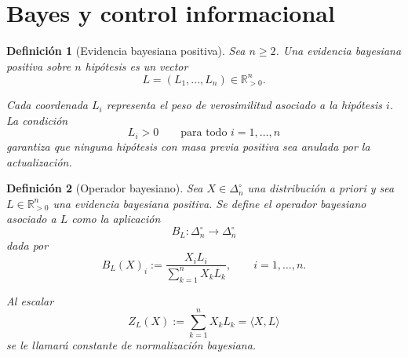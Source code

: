 \documentclass[12pt]{article}
\newtheorem{definicion}{Definición}[section]
\begin{document}
%
%
%
%


\clearpage
\section{Bayes y control informacional}

\begin{definicion}[Evidencia bayesiana positiva]
Sea \(n\geq 2\). Una \emph{evidencia bayesiana positiva} sobre \(n\)
hipótesis es un vector
\[
L=(L_1,\dots,L_n)\in \mathbb{R}_{>0}^{n}.
\]

Cada coordenada \(L_i\) representa el peso de verosimilitud asociado a la
hipótesis \(i\). La condición
\[
L_i>0
\qquad
\text{para todo } i=1,\dots,n
\]
garantiza que ninguna hipótesis con masa previa positiva sea anulada por la
actualización.
\end{definicion}

\begin{definicion}[Operador bayesiano]
Sea \(X\in\Delta_n^\circ\) una distribución a priori y sea
\(L\in\mathbb{R}_{>0}^{n}\) una evidencia bayesiana positiva. Se define el
\emph{operador bayesiano asociado a \(L\)} como la aplicación
\[
B_L:\Delta_n^\circ\longrightarrow \Delta_n^\circ
\]
dada por
\[
B_L(X)_i
:=
\frac{X_iL_i}{\sum_{k=1}^{n}X_kL_k},
\qquad
i=1,\dots,n.
\]

Al escalar
\[
Z_L(X)
:=
\sum_{k=1}^{n}X_kL_k
=
\langle X,L\rangle
\]
se le llamará \emph{constante de normalización bayesiana}.
\end{definicion}
\end{document}
